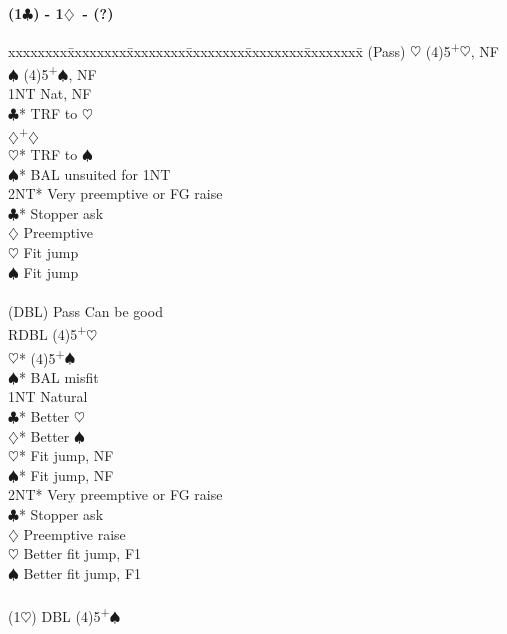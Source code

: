 \documentclass[10pt]{article}
\renewcommand{\c}{$\clubsuit$}
\renewcommand{\d}{$\diamondsuit$}
\newcommand{\h}{$\heartsuit$}
\newcommand{\s}{$\spadesuit$}
\newcommand{\p}{\textsuperscript{+}}
\newcommand{\x}{DBL}
\newcommand{\xx}{RDBL}
\newenvironment{bidtable}[1][]
{\textbf{#1}
  \begin{adjustwidth}{1em}{}
    \addvspace{2pt}
    \begin{tabbing}
      xxxxxxxx\=xxxxxxxx\=xxxxxxxx\=xxxxxxxx\=xxxxxxxx\=xxxxxxxx\=\kill}
{\end{tabbing}\end{adjustwidth}\bigskip}%
\begin{document}
\begin{multicols*}{2}
\begin{bidtable}[(1\c) - 1\d\ - (?)]
(Pass) \h  \> (4)5\p\h, NF                \\
       \s  \> (4)5\p\s, NF                \\
       \> 1NT  \> Nat, NF                     \\
       \c* \> TRF to \h                   \\
       \d  {}\p\d                       \\
       \h* \> TRF to \s                   \\
       \s* \> BAL unsuited for 1NT        \\
       \> 2NT* \> Very preemptive or FG raise \\
       \c* \> Stopper ask                 \\
       \d  \> Preemptive                  \\
       \h  \> Fit jump                    \\
       \s  \> Fit jump                    \\
                                              \\
(\x)   \> Pass \> Can be good                 \\
       \> \xx  \> (4)5\p\h                    \\
       \h* \> (4)5\p\s                    \\
       \s* \> BAL misfit                  \\
       \> 1NT  \> Natural                     \\
       \c* \> Better \h                   \\
       \d* \> Better \s                   \\
       \h* \> Fit jump, NF                \\
       \s* \> Fit jump, NF                \\
       \> 2NT* \> Very preemptive or FG raise \\
       \c* \> Stopper ask                 \\
       \d  \> Preemptive raise            \\
       \h  \> Better fit jump, F1         \\
       \s  \> Better fit jump, F1         \\
                                              \\
(1\h)  \> \x   \> (4)5\p\s                    \\

\end{bidtable}
\end{multicols*}
\end{document}
